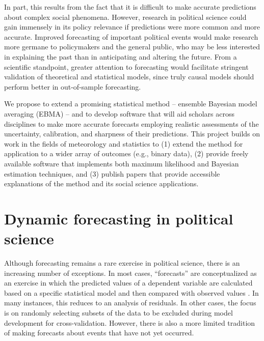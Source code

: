 \documentclass[pdftex,12pt,fullpage,oneside]{amsart}
\begin{document}
In part, this results from the fact that it is difficult to make
accurate predictions about complex social phenomena. However, research
in political science could gain immensely in its policy relevance if
predictions were more common and more accurate.  Improved forecasting
of important political events would make research more germane to
policymakers and the general public, who may be less interested in
explaining the past than in anticipating and altering the future.  From a
scientific standpoint, greater attention to forecasting would
facilitate stringent validation of theoretical and statistical models,
since truly causal models should perform better in out-of-sample
forecasting.

We propose to extend a promising statistical method -- ensemble
Bayesian model averaging (EBMA) -- and to develop software that will
aid scholars across disciplines to make more accurate forecasts
employing realistic assessments of the uncertainty, calibration, and
sharpness of their predictions.  This project builds on work in the
fields of meteorology and statistics to (1) extend the method for
application to a wider array of outcomes (e.g., binary data), (2)
provide freely available software that implements both maximum
likelihood and Bayesian estimation techniques, and (3) publish papers
that provide accessible explanations of the method and its social
science applications.


\section{Dynamic forecasting in political science}

Although forecasting remains a rare exercise in political science,
there is an increasing number of exceptions.  In most cases,
``forecasts'' are conceptualized as an exercise in which the predicted
values of a dependent variable are calculated based on a specific
statistical model and then compared with observed values
\citep[e.g.,][]{Hildebrand:etal:1976}. In many instances, this reduces
to an analysis of residuals.  In other cases, the focus is on randomly
selecting subsets of the data to be excluded during model development
for cross-validation.  However, there is also a more limited tradition
of making forecasts about events that have not yet occurred.
\end{document}
